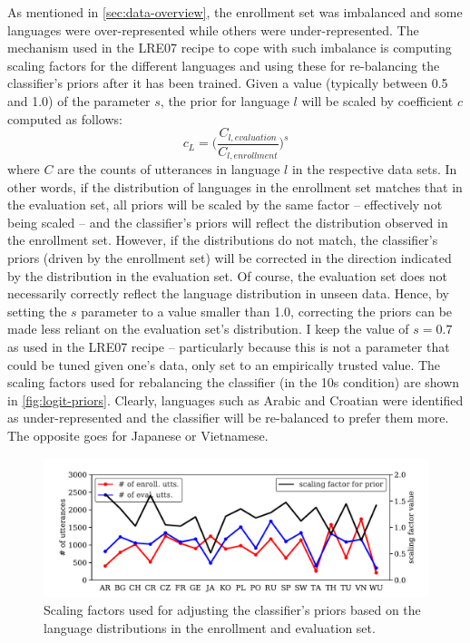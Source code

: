 \documentclass[bsc,frontabs,twoside,singlespacing,parskip,deptreport]{infthesis}
\begin{document}
{{{      %
      As mentioned in \autoref{sec:data-overview}, the enrollment set was imbalanced and some languages were over-represented while others were under-represented. The mechanism used in the LRE07 recipe to cope with such imbalance is computing scaling factors for the different languages and using these for re-balancing the classifier's priors after it has been trained. Given a value (typically between 0.5 and 1.0) of the parameter $s$, the prior for language $l$ will be scaled by coefficient $c$ computed as follows:
      \begin{equation}
        \label{eq:logit-prior}
        c_L = \bigg( \frac{C_{l, evaluation}}{C_{l, enrollment}} \bigg)^s
      \end{equation}
      where $C$ are the counts of utterances in language $l$ in the respective data sets. In other words, if the distribution of languages in the enrollment set matches that in the evaluation set, all priors will be scaled by the same factor -- effectively not being scaled -- and the classifier's priors will reflect the distribution observed in the enrollment set. However, if the distributions do not match, the classifier's priors (driven by the enrollment set) will be corrected in the direction indicated by the distribution in the evaluation set. Of course, the evaluation set does not necessarily correctly reflect the language distribution in unseen data. Hence, by setting the $s$ parameter to a value smaller than 1.0, correcting the priors can be made less reliant on the evaluation set's distribution.
      I keep the value of $s=0.7$ as used in the LRE07 recipe -- particularly because this is not a parameter that could be tuned given one's data, only set to an empirically trusted value. The scaling factors used for rebalancing the classifier (in the 10s condition) are shown in \autoref{fig:logit-priors}. Clearly, languages such as Arabic and Croatian were identified as under-represented and the classifier will be re-balanced to prefer them more. The opposite goes for Japanese or Vietnamese.
      \begin{figure}[h!]
        \centering
        \includegraphics[width=15cm]{../img/logit-priors.pdf}
        \vspace*{-1em}
        \caption{Scaling factors used for adjusting the classifier's priors based on the language distributions in the enrollment and evaluation set.}
        \label{fig:logit-priors}
      \end{figure}

}}}
\end{document}
